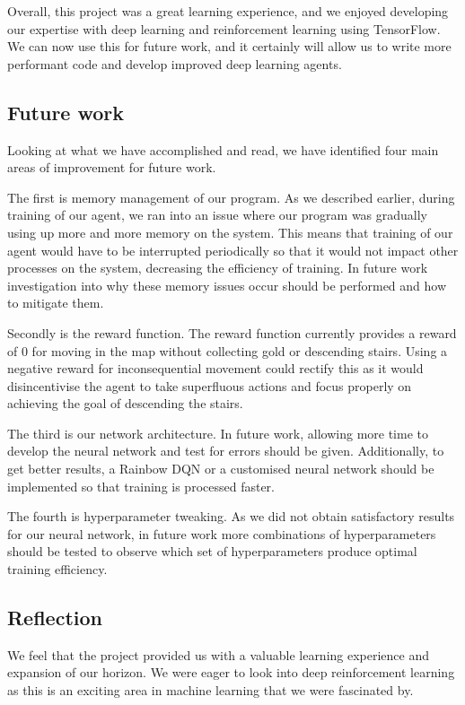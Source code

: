\documentclass[12pt,a4paper]{article}
\begin{document}
    Overall, this project was a great learning experience, and we enjoyed developing our expertise with deep learning and reinforcement learning
    using TensorFlow.
    We can now use this for future work, and it certainly will allow us to write more performant code and develop improved deep learning agents.

    \subsection{Future work}\label{subsec:future-work}
    Looking at what we have accomplished and read, we have identified four main areas of improvement for future work.

    The first is memory management of our program.
    As we described earlier, during training of our agent, we ran into an issue where our program was gradually using up more and more memory on the system.
    This means that training of our agent would have to be interrupted periodically so that it would not impact other processes on the system, decreasing the efficiency of training.
    In future work investigation into why these memory issues occur should be performed and how to mitigate them.

    Secondly is the reward function.
    The reward function currently provides a reward of 0 for moving in the map without collecting gold or descending stairs.
    Using a negative reward for inconsequential movement could rectify this as it would disincentivise the agent to take
    superfluous actions and focus properly on achieving the goal of descending the stairs.

    The third is our network architecture.
    In future work, allowing more time to develop the neural network and test for errors should be given.
    Additionally, to get better results, a Rainbow DQN or a customised neural network should be implemented so that
    training is processed faster.

    The fourth is hyperparameter tweaking.
    As we did not obtain satisfactory results for our neural network, in future work more combinations of hyperparameters
    should be tested to observe which set of hyperparameters produce optimal training efficiency.

    \subsection{Reflection}\label{subsec:reflection}
    We feel that the project provided us with a valuable learning experience and expansion of our horizon.
    We were eager to look into deep reinforcement learning as this is an exciting area in machine learning that we were fascinated by.
\end{document}
